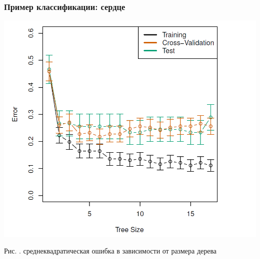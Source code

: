 \documentclass[pdf, 9pt, usenames, dvipsnames, unicode, hyperref={bookmarks=true,bookmarksopen=false, bookmarksnumbered}]{beamer}
\begin{document}

\begin{frame}\frametitle{Пример классификации: сердце}

\begin{center}
	\includegraphics[scale=0.3]{pic73}
\end{center}

    \begin{center}
	Рис. . среднеквадратическая ошибка в зависимости от размера дерева
    \end{center}


\end{frame}

\end{document}
